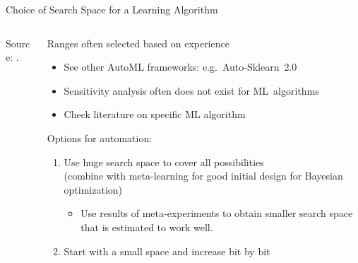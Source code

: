 \begin{frame}{Choice of Search Space for a Learning Algorithm}
\begin{columns}
\begin{column}{0.4\textwidth}
\begin{center}
  			{\tiny Source: .}
  			
  		\end{center}
  	\end{column}
  	
    \begin{column}{0.6\textwidth}
    
    Ranges often selected based on experience
    \begin{itemize}

      \item See other AutoML frameworks: e.g.\ Auto-Sklearn~2.0 

      \item Sensitivity analysis often does not exist for ML~algorithms
      \item Check literature on specific ML algorithm
    \end{itemize}
	\pause
    Options for automation:
    \begin{enumerate}
      \item Use huge search space to cover all possibilities \\ 
            (combine with meta-learning for good initial design for Bayesian optimization)
      \begin{itemize} 
      		\item Use results of meta-experiments to obtain smaller search space that is estimated to work well.
       \end{itemize}
   		\pause
   	  \item Start with a small space and increase bit by bit
    \end{enumerate}
    \end{column}%

  \end{columns}
\end{frame}

